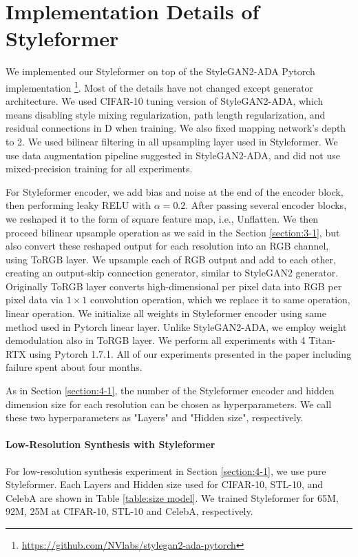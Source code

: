 \documentclass[10pt,twocolumn,letterpaper]{article}
\begin{document}
{\small


}

\newpage


\appendix



\section{Implementation Details of Styleformer}
\label{app:A}
We implemented our Styleformer on top of the StyleGAN2-ADA Pytorch implementation \footnote{\url{https://github.com/NVlabs/stylegan2-ada-pytorch}}. 
Most of the details have not changed except generator architecture. We used CIFAR-10 tuning version of StyleGAN2-ADA, which means disabling style mixing regularization, path length regularization, and residual connections in D when training. We also fixed mapping network's depth to 2. We used bilinear filtering in all upsampling layer used in Styleformer. We use data augmentation pipeline suggested in StyleGAN2-ADA, and did not use mixed-precision training for all experiments.

For Styleformer encoder, we add bias and noise at the end of the encoder block, then performing leaky RELU with $\alpha=0.2$. After passing several encoder blocks, we reshaped it to the form of square feature map, i.e., Unflatten. We then proceed bilinear upsample operation as we said in the Section \ref{section:3-1}, but also convert these reshaped output for each resolution into an RGB channel, using ToRGB layer. We upsample each of RGB output and add to each other, creating an output-skip connection generator, similar to StyleGAN2 generator. Originally ToRGB layer converts high-dimensional per pixel data into RGB per pixel data via $1 \times 1$ convolution operation, which we replace it to same operation, linear operation. We initialize all weights in Styleformer encoder using same method used in Pytorch linear layer. Unlike StyleGAN2-ADA, we employ weight demodulation also in ToRGB layer. We perform all experiments with 4 Titan-RTX using Pytorch 1.7.1. All of our experiments presented in the paper including failure spent about four months.

As in Section \ref{section:4-1}, the number of the Styleformer encoder and hidden dimension size for each resolution can be chosen as hyperparameters. We call these two hyperparameters as "Layers" and "Hidden size", respectively. 

\paragraph{Low-Resolution Synthesis with Styleformer}
For low-resolution synthesis experiment in Section \ref{section:4-1}, we use pure Styleformer. Each Layers and Hidden size used for CIFAR-10, STL-10, and CelebA are shown in Table \ref{table:size model}. We trained Styleformer for 65M, 92M, 25M at CIFAR-10, STL-10 and CelebA, respectively.
\end{document}
